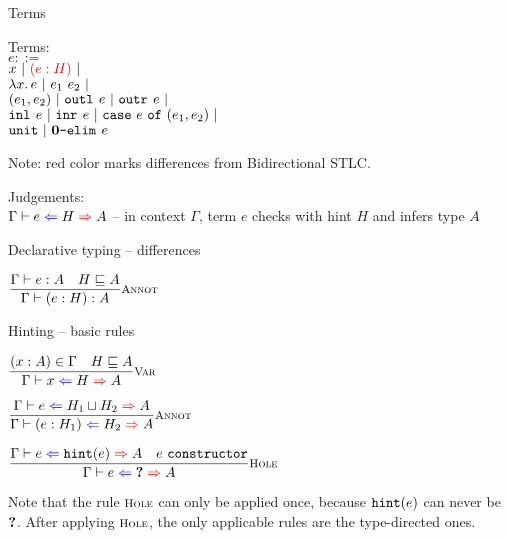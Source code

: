 \documentclass{beamer}
\begin{document}
\begin{frame}{Terms}

Terms: \\
$e ::=$ \\
\qquad $x \pipe \termdiff{\annot{e}{H}} \pipe $ \\
\qquad $\fun{x}{e} \pipe \app{e_1}{e_2} \pipe$ \\
\qquad $(e_1, e_2) \ |\  \texttt{outl}_{}\ e \ |\  \texttt{outr}_{}\ e \ |\ $ \\
\qquad $\texttt{inl}_{}\ e \ |\  \texttt{inr}_{}\ e \ |\  \texttt{case}\ e\ \texttt{of}\ (e_1, e_2) \ |\ $ \\
\qquad $\texttt{unit} \ |\  \textbf{0}\texttt{-elim}_{}\ e$

\vspace{2em}

Note: red color marks differences from Bidirectional STLC.

\vspace{2em}

Judgements: \\
$\hinting[\Gamma]{e}{H}{A}$ -- in context $\Gamma$, term $e$ checks with hint $H$ and infers type $A$

\end{frame}

\begin{frame}{Declarative typing -- differences}

\begin{center}
  $\infrule[Annot]{\typing{e}{A} \quad \sidecond{\hintorder{H}{A}}}{\typing{\annot{e}{H}}{A}}$
\end{center}

\end{frame}

\begin{frame}{Hinting -- basic rules}

\begin{center}
  $\infrule[Var]{\sidecond{(x : A) \in \Gamma} \quad \sidecond{\hintorder{H}{A}}}{\hinting{x}{H}{A}}$

  \vspace{2em}

  $\infrule[Annot]{\hinting{e}{\hintlub{H_1}{H_2}}{A}}{\hinting{\annot{e}{H_1}}{H_2}{A}}$

  \vspace{2em}

  $\infrule[Hole]{\hinting{e}{\hintfor{e}}{A} \quad \sidecond{e\ \texttt{constructor}}}{\hinting{e}{\Hole}{A}}$
\end{center}

\vspace{2em}

Note that the rule $\textsc{\footnotesize{Hole}}$ can only be applied once, because $\texttt{hint}(e)$ can never be $\textbf{?}$. After applying $\textsc{\footnotesize{Hole}}$, the only applicable rules are the type-directed ones.

\end{frame}
\end{document}

